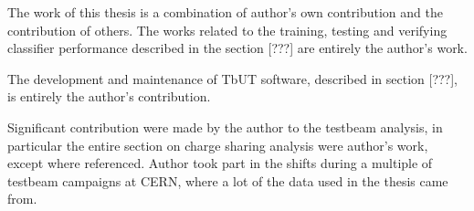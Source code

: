 \noindent The work of this thesis is a combination of author's own contribution and the contribution of others. The works related to the training, testing and verifying classifier performance described in the section [???] are entirely the author's work. 

\noindent The development and maintenance of TbUT software, described in section [???], is entirely the author's contribution. 

\noindent Significant contribution were made by the author to the testbeam analysis, in particular the entire section on charge sharing analysis were author's work, except where referenced. Author took part in the shifts during a multiple of testbeam campaigns at CERN, where a lot of the data used in the thesis came from. 